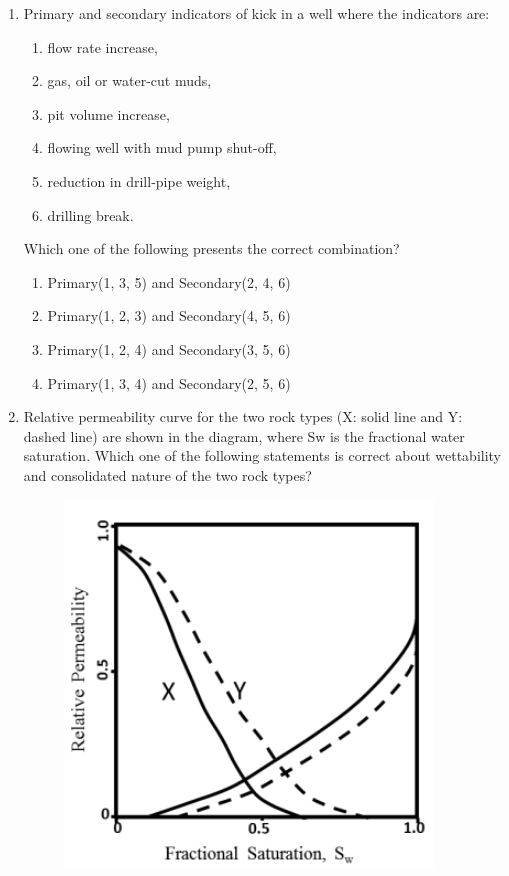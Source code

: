 \documentclass[12pt,a4paper]{article}
\begin{document}
\begin{enumerate}
\begin{enumerate} 
\end{enumerate}



\item Primary and secondary indicators of kick in a well where the indicators are: \hfill{}
\begin{enumerate}
\item flow rate increase,
\item gas, oil or water-cut muds,
\item pit volume increase,
\item flowing well with mud pump shut-off,
\item reduction in drill-pipe weight,
\item drilling break.
\end{enumerate}
\noindent
Which one of the following presents the correct combination?


\begin{enumerate} 

\item Primary(1, 3, 5) and Secondary(2, 4, 6) 
\item Primary(1, 2, 3) and Secondary(4, 5, 6) 
\item Primary(1, 2, 4) and Secondary(3, 5, 6) 
\item Primary(1, 3, 4) and Secondary(2, 5, 6) 

\end{enumerate}
\pagebreak
\item Relative permeability curve for the two rock types (X: solid line and Y: dashed line) are
shown in the diagram, where Sw is the fractional water saturation. Which one of the
following statements is correct about wettability and consolidated nature of the two rock
types?\hfill{}
\begin{figure}[h!]
  \centering
  \includegraphics[width=0.5\columnwidth]{figs/pic11.png} 
\end{figure}


\end{enumerate}
\end{document}
